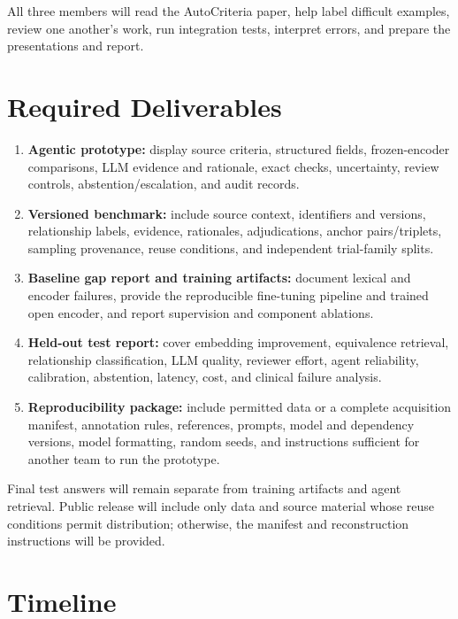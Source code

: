 \documentclass[11pt]{article}
\begin{document}
All three members will read the AutoCriteria paper, help label difficult examples, review one another's work, run integration tests, interpret errors, and prepare the presentations and report.

\section{Required Deliverables}

\begin{enumerate}
    \item \textbf{Agentic prototype:} display source criteria, structured fields, frozen-encoder comparisons, LLM evidence and rationale, exact checks, uncertainty, review controls, abstention/escalation, and audit records.
    \item \textbf{Versioned benchmark:} include source context, identifiers and versions, relationship labels, evidence, rationales, adjudications, anchor pairs/triplets, sampling provenance, reuse conditions, and independent trial-family splits.
    \item \textbf{Baseline gap report and training artifacts:} document lexical and encoder failures, provide the reproducible fine-tuning pipeline and trained open encoder, and report supervision and component ablations.
    \item \textbf{Held-out test report:} cover embedding improvement, equivalence retrieval, relationship classification, LLM quality, reviewer effort, agent reliability, calibration, abstention, latency, cost, and clinical failure analysis.
    \item \textbf{Reproducibility package:} include permitted data or a complete acquisition manifest, annotation rules, references, prompts, model and dependency versions, model formatting, random seeds, and instructions sufficient for another team to run the prototype.
\end{enumerate}

Final test answers will remain separate from training artifacts and agent retrieval. Public release will include only data and source material whose reuse conditions permit distribution; otherwise, the manifest and reconstruction instructions will be provided.

\section{Timeline}
\end{document}
